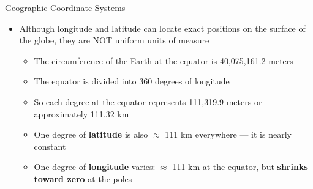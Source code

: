 \documentclass[hyperref={pdfpagelabels=false}]{beamer}
\begin{document}
 
 
 
 
 
 
 
\begin{frame}{Geographic Coordinate Systems}
	\begin{itemize}
		
		\item Although longitude and latitude can locate exact positions on the surface of the globe, they are NOT uniform units of measure
		\vspace{0.2cm}
		\begin{itemize}
			\item The circumference of the Earth at the equator is 40,075,161.2 meters
			\vspace{0.2cm}
			\item The equator is divided into 360 degrees of longitude
			\vspace{0.2cm}
			\item So each degree at the equator represents 111,319.9 meters or approximately 111.32 km
			\vspace{0.2cm}
			\item One degree of \textbf{latitude} is also $\approx$ 111 km everywhere --- it is nearly constant
			\vspace{0.2cm}
			\item One degree of \textbf{longitude} varies: $\approx$ 111 km at the equator, but \textbf{shrinks toward zero} at the poles
		\end{itemize}
		
	\end{itemize}
\end{frame}
 
 
 
\end{document}
